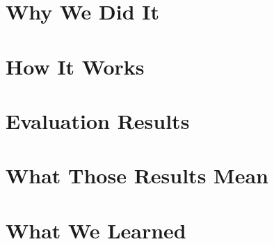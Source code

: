 \documentclass[a4paper, 12pt]{article}
\begin{document}
\section{Why We Did It}



\section{How It Works}



\section{Evaluation Results}



\section{What Those Results Mean}



\section{What We Learned}

\end{document}
